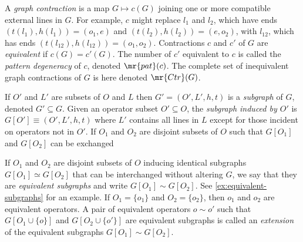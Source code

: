 \documentclass[11pt,fleqn]{article}
\numberwithin{equation}{section}
\begin{document}
\begin{dfn}
A \textit{graph contraction} is a map $G\mapsto c(G)$ joining one or more compatible external lines in $G$.
For example, $c$ might replace $l_1$ and $l_2$, which have ends $(t(l_1),h(l_1))=(o_1,e)$ and $(t(l_2),h(l_2))=(e,o_2)$, with $l_{12}$, which has ends $(t(l_{12}),h(l_{12}))=(o_1,o_2)$.
Contractions $c$ and $c'$ of $G$ are \textit{equivalent} if $c(G)=c'(G)$.
The number of $c'$ equivalent to $c$ is called the \textit{pattern degeneracy} of $c$, denoted $\mr{pat}(c)$.
The complete set of inequivalent graph contractions of $G$ is here denoted $\mr{Ctr}(G)$.
\end{dfn}

\begin{dfn}
\end{dfn}

\begin{dfn}
If $O'$ and $L'$ are subsets of $O$ and $L$ then $G'=(O',L',h,t)$ is a \textit{subgraph} of $G$, denoted $G'\subseteq G$.
Given an operator subset $O'\subseteq O$, the \textit{subgraph induced by $O'$} is $G[O']\equiv(O',L',h,t)$ where $L'$ contains all lines in $L$ except for those incident on operators not in $O'$.
If $O_1$ and $O_2$ are disjoint subsets of $O$ such that $G[O_1]$ and $G[O_2]$ can be exchanged 

If $O_1$ and $O_2$ are disjoint subsets of $O$ inducing identical subgraphs $G[O_1]\simeq G[O_2]$ that can be interchanged without altering $G$, we say that they are \textit{equivalent subgraphs} and write $G[O_1]\sim G[O_2]$.
See \cref{ex:equivalent-subgraphs} for an example.
If $O_1=\{o_1\}$ and $O_2=\{o_2\}$, then $o_1$ and $o_2$ are equivalent operators.
A pair of equivalent operators $o\sim o'$ such that $G[O_1\cup\{o\}]$ and $G[O_2\cup\{o'\}]$ are equivalent subgraphs is called an \textit{extension} of the equivalent subgraphs $G[O_1]\sim G[O_2]$.
\end{dfn}
\end{document}
